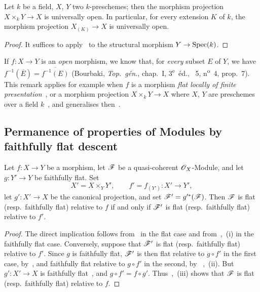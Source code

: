 \begin{corollary}[2.4.10]
\label{IV.2.4.10}
Let $k$ be a field, $X$, $Y$ two $k$-preschemes; then the morphism projection $X\times_k Y\to X$ is universally open.
In particular, for every extension $K$ of $k$, the morphism projection $X_{(K)}\to X$ is universally open.
\end{corollary}

\begin{proof}
It suffices to apply~ to the structural morphism $Y\to\operatorname{Spec}(k)$.
\end{proof}

\begin{remark}[2.4.11]
\label{IV.2.4.11}
If $f:X\to Y$ is an \emph{open} morphism, we know that, for \emph{every} subset $E$ of $Y$, we have $f^{-1}(\overline{E})=\overline{f^{-1}(E)}$ (Bourbaki, \emph{Top.~g\'{e}n.}, chap.~I, 3\textsuperscript{e}~\'{e}d., \textsection~5, n\textsuperscript{o}~4, prop.~7).
This remark applies for example when $f$ is a morphism \emph{flat locally of finite presentation}~, or a morphism projection $X\times_k Y\to X$ where $X$, $Y$ are preschemes over a field $k$~, and generalises then~.
\end{remark}

\subsection{Permanence of properties of Modules by faithfully flat descent}
\label{subsection:IV.2.5}

\begin{proposition}[2.5.1]
\label{IV.2.5.1}
Let $f:X\to Y$ be a morphism, let $\mathscr{F}$ be a quasi-coherent
$\mathscr{O}_X$-Module, and let $g:Y'\to Y$ be faithfully flat. Set
\[
  X'=X\times_Y Y',\qquad
  f'=f_{(Y')}:X'\to Y',
\]
let $g':X'\to X$ be the canonical projection, and set
$\mathscr{F}'=g'^*(\mathscr{F})$. Then $\mathscr{F}$ is flat \textup{(resp.}\
faithfully flat\textnormal{)} relative to $f$ if and only if $\mathscr{F}'$ is
flat \textup{(resp.}\ faithfully flat\textnormal{)} relative to $f'$.
\end{proposition}

\begin{proof}
The direct implication follows from~ in the flat case and
from~\sref{IV.2.2.11},~(i) in the faithfully flat case. Conversely, suppose
that $\mathscr{F}'$ is flat \textnormal{(}resp.\ faithfully flat\textnormal{)}
relative to $f'$. Since $g$ is faithfully flat, $\mathscr{F}'$ is then flat
relative to $g\circ f'$ in the first case, by~\sref{IV.2.1.6}, and
faithfully flat relative to $g\circ f'$ in the second, by
~,~(ii). But $g':X'\to X$ is faithfully
flat~, and $g\circ f'=f\circ g'$.
Thus~,~(iii) shows that $\mathscr{F}$ is flat
\textnormal{(}resp.\ faithfully flat\textnormal{)} relative to $f$.
\end{proof}

